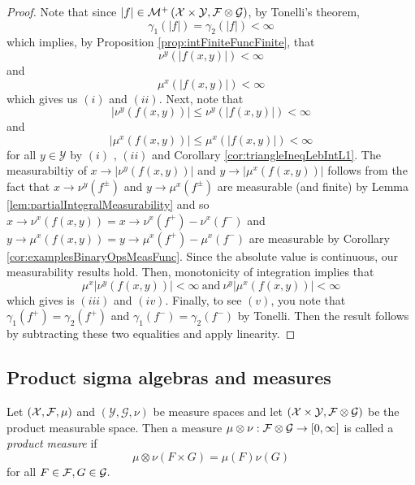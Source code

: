 \begin{proof}
Note that since $\lvert f\rvert\in\mathcal{M}^{+}\left(\mathcal{X}\times\mathcal{Y},\mathcal{F}\otimes\mathcal{G}\right)$,
by Tonelli's theorem,
\[
\gamma_{1}\left(\lvert f\rvert\right)=\gamma_{2}\left(\lvert f\rvert\right)<\infty
\]
which implies, by Proposition \ref{prop:intFiniteFuncFinite}, that
\[
\nu^{y}\left(\lvert f\left(x,y\right)\rvert\right)<\infty
\]
and
\[
\mu^{x}\left(\lvert f\left(x,y\right)\rvert\right)<\infty
\]
which gives us $\left(i\right)$ and $\left(ii\right)$. Next, note
that
\[
\lvert\nu^{y}\left(f\left(x,y\right)\right)\rvert\leq\nu^{y}\left(\lvert f\left(x,y\right)\rvert\right)<\infty
\]
and
\[
\lvert\mu^{x}\left(f\left(x,y\right)\right)\rvert\leq\mu^{x}\left(\lvert f\left(x,y\right)\rvert\right)<\infty
\]
for all $y\in\mathcal{Y}$ by $\left(i\right)$ , $\left(ii\right)$
and Corollary \ref{cor:triangleIneqLebIntL1}. The measurabiltiy of
$x\to\lvert\nu^{y}\left(f\left(x,y\right)\right)\rvert$ and $y\to\lvert\mu^{x}\left(f\left(x,y\right)\right)\rvert$
follows from the fact that $x\to\nu^{y}\left(f^{\pm}\right)$ and
$y\to\mu^{x}\left(f^{\pm}\right)$ are measurable (and finite) by
Lemma \ref{lem:partialIntegralMeasurability} and so $x\to\nu^{x}\left(f\left(x,y\right)\right)=x\to\nu^{x}\left(f^{+}\right)-\nu^{x}\left(f^{-}\right)$
and $y\to\mu^{x}\left(f\left(x,y\right)\right)=y\to\mu^{x}\left(f^{+}\right)-\mu^{x}\left(f^{-}\right)$
are measurable by Corollary \ref{cor:examplesBinaryOpsMeasFunc}.
Since the absolute value is continuous, our measurability results
hold. Then, monotonicity of integration implies that 
\[
\mu^{x}\lvert\nu^{y}\left(f\left(x,y\right)\right)\rvert<\infty\ \text{and}\ \nu^{y}\lvert\mu^{x}\left(f\left(x,y\right)\right)\rvert<\infty
\]
which gives is $\left(iii\right)$ and $\left(iv\right).$ Finally,
to see $\left(v\right)$, you note that $\gamma_{1}\left(f^{+}\right)=\gamma_{2}\left(f^{+}\right)$
and $\gamma_{1}\left(f^{-}\right)=\gamma_{2}\left(f^{-}\right)$ by
Tonelli. Then the result follows by subtracting these two equalities
and apply linearity.
\end{proof}

\subsection{Product sigma algebras and measures}
\begin{defn}
\label{def:productMeasure}Let $\left(\mathcal{X},\mathcal{F},\mu\right)$ and $\left(\mathcal{Y},\mathcal{G},\nu\right)$
be measure spaces and let $\left(\mathcal{X}\times\mathcal{Y},\mathcal{F}\otimes\mathcal{G}\right)$
be the product measurable space. Then a measure $\mu\otimes\nu:\mathcal{F}\otimes\mathcal{G}\to\left[0,\infty\right]$
is called a \emph{product measure }if
\[
\mu\otimes\nu\left(F\times G\right)=\mu\left(F\right)\nu\left(G\right)
\]
for all $F\in\mathcal{F},G\in\mathcal{G}.$
\end{defn}

